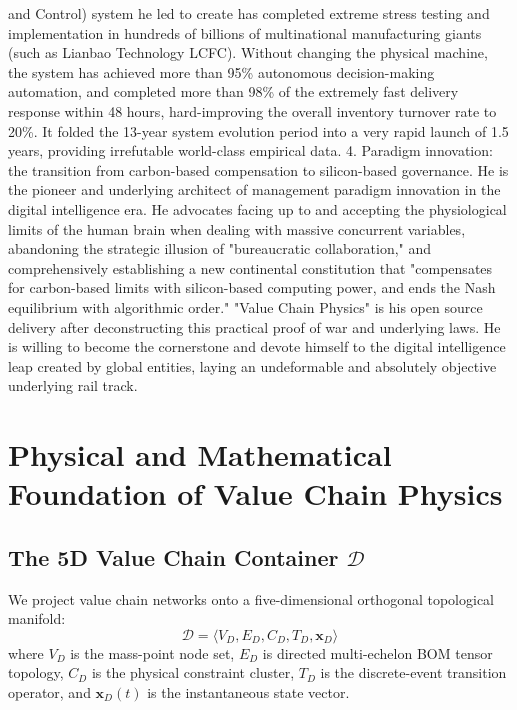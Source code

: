 \documentclass[11pt,a4paper]{article}
\begin{document}
and Control) system he led to create has completed extreme stress testing and implementation in hundreds of billions of multinational manufacturing giants (such as Lianbao Technology LCFC). Without changing the physical machine, the system has achieved more than 95\% autonomous decision-making automation, and completed more than 98\% of the extremely fast delivery response within 48 hours, hard-improving the overall inventory turnover rate to 20\%. It folded the 13-year system evolution period into a very rapid launch of 1.5 years, providing irrefutable world-class empirical data. 4. Paradigm innovation: the transition from carbon-based compensation to silicon-based governance. He is the pioneer and underlying architect of management paradigm innovation in the digital intelligence era. He advocates facing up to and accepting the physiological limits of the human brain when dealing with massive concurrent variables, abandoning the strategic illusion of "bureaucratic collaboration," and comprehensively establishing a new continental constitution that "compensates for carbon-based limits with silicon-based computing power, and ends the Nash equilibrium with algorithmic order." "Value Chain Physics" is his open source delivery after deconstructing this practical proof of war and underlying laws. He is willing to become the cornerstone and devote himself to the digital intelligence leap created by global entities, laying an undeformable and absolutely objective underlying rail track.

\newpage
\section*{Physical and Mathematical Foundation of Value Chain Physics}

\subsection*{The 5D Value Chain Container $\mathcal{D}$}
We project value chain networks onto a five-dimensional orthogonal topological manifold:
\begin{equation}
    \mathcal{D} = \langle V_D, E_D, C_D, T_D, \mathbf{x}_D \rangle
\end{equation}
where $V_D$ is the mass-point node set, $E_D$ is directed multi-echelon BOM tensor topology, $C_D$ is the physical constraint cluster, $T_D$ is the discrete-event transition operator, and $\mathbf{x}_D(t)$ is the instantaneous state vector.
\end{document}
